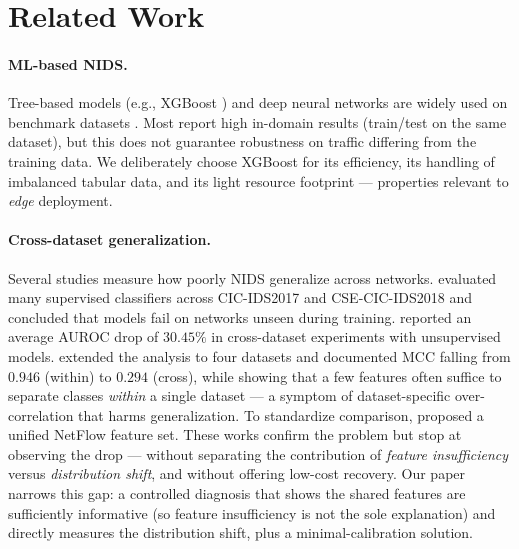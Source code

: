 \documentclass[preprint,12pt,authoryear]{elsarticle}
\begin{document}
\section{Related Work}
\label{sec:related}

\paragraph{ML-based NIDS.} Tree-based models (e.g., XGBoost
\citep{xgboost,husain,zhou}) and deep neural networks
\citep{shone,liulang,mahdavifar,wu,duan} are widely used on benchmark datasets
\citep{unsw,cicids}. Most report high in-domain results (train/test on the same
dataset), but this does not guarantee robustness on traffic differing from the
training data. We deliberately choose XGBoost for its efficiency, its handling of
imbalanced tabular data, and its light resource footprint --- properties relevant
to \emph{edge} deployment.

\paragraph{Cross-dataset generalization.} Several studies measure how poorly NIDS
generalize across networks. \citet{dhooge} evaluated many supervised classifiers
across CIC-IDS2017 and CSE-CIC-IDS2018 and concluded that models fail on networks
unseen during training. \citet{verkerken} reported an average AUROC drop of
$30.45\%$ in cross-dataset experiments with unsupervised models. \citet{cantone}
extended the analysis to four datasets and documented MCC falling from $0.946$
(within) to $0.294$ (cross), while showing that a few features often suffice to
separate classes \emph{within} a single dataset --- a symptom of dataset-specific
over-correlation that harms generalization. To standardize comparison,
\citet{sarhan,sarhannf} proposed a unified NetFlow feature set. These works confirm
the problem but stop at observing the drop --- without separating the contribution
of \emph{feature insufficiency} versus \emph{distribution shift}, and without
offering low-cost recovery. Our paper narrows this gap: a controlled diagnosis that
shows the shared features are sufficiently informative (so feature insufficiency is
not the sole explanation) and directly measures the distribution shift, plus a
minimal-calibration solution.
\end{document}
